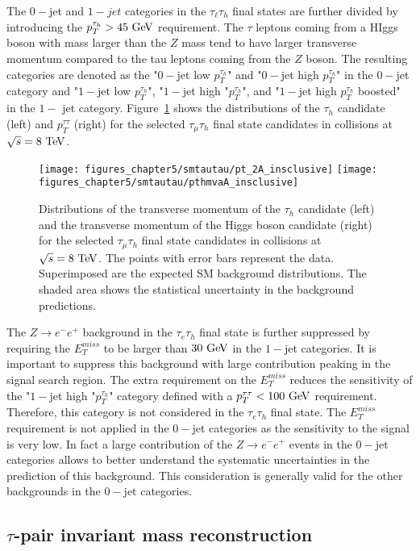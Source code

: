 The $0-$jet and $1-jet$ categories in the $\tau_{\ell}\tau_{h}$ final states are further divided by introducing the $p_{T}^{\tau_h}>45~\mathrm{Ge\kern -0.1em V}$ requirement. The $\tau$ leptons coming from a HIggs boson with mass larger than the $Z$ mass tend to have larger transverse momentum compared to the tau leptons coming from the $Z$ boson. The resulting categories are denoted as the "$0-$jet low $p_{T}^{\tau_h}$" and "$0-$jet high $p_{T}^{\tau_h}$" in the $0-$jet category and  "$1-$jet low $p_{T}^{\tau_h}$", "$1-$jet high "$p_{T}^{\tau_h}$", and "$1-$jet high $p_{T}^{\tau_h}$ boosted" in the $1-$ jet category. Figure~\ref{fig:higgspt} shows the distributions of the $\tau_{h}$ candidate (left) and $p_{T}^{\tau\tau} $ (right) for the selected $\tau_{\mu}\tau_{h}$ final state candidates in collisions at $\sqrt{s}=8~\mathrm{Te\kern -0.1em V}$. 
\begin{figure}[htbp]
\centering
\texttt{[image: figures\_chapter5/smtautau/pt\_2A\_insclusive]}
\texttt{[image: figures\_chapter5/smtautau/pthmvaA\_insclusive]}
\caption{Distributions of the transverse momentum of the $\tau_{h}$ candidate (left)  and the transverse momentum of the Higgs boson candidate (right) for the selected $\tau_{\mu}\tau_{h}$ final state candidates in collisions at $\sqrt{s}=8~\mathrm{Te\kern -0.1em V}$. The points with error bars represent the data. Superimposed are the expected SM background distributions. The shaded area shows the statistical uncertainty in the background predictions.}
\label{fig:higgspt}
\end{figure}
The $Z\rightarrow e^{-}e^{+}$ background in the $\tau_{e}\tau_h$ final state is further suppressed by requiring the $E_{T}^{miss}$ to be larger than $30~\mathrm{Ge\kern -0.1em V}$ in the $1-$jet categories. It is important to suppress this background with large contribution peaking in the signal search region. The extra requirement on the $E_{T}^{miss}$ reduces the sensitivity of the "$1-$jet high "$p_{T}^{\tau_h}$" category defined with a $p_{T}^{\tau\tau}<100~\mathrm{Ge\kern -0.1em V}$ requirement. Therefore, this category is not considered in the $\tau_e\tau_h$ final state. The $E_{T}^{miss}$ requirement is not applied in the $0-$jet categories as the sensitivity to the signal is very low. In fact a large contribution of the $Z\rightarrow e^{-}e^{+}$ events in the $0-$jet categories allows to better understand the systematic uncertainties in the prediction of this background. This consideration is generally valid for the other backgrounds in the $0-$jet categories.

\subsection{$\tau$-pair invariant mass reconstruction}




